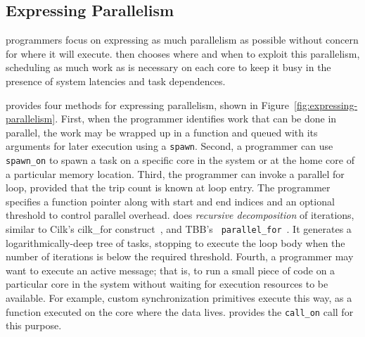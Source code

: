 



\subsection{Expressing Parallelism}

\Grappa programmers focus on expressing as much parallelism as possible
without concern for where it will execute. \Grappa then chooses where and when
to exploit this parallelism, scheduling as much work as is necessary on each
core to keep it busy in the presence of system latencies and task dependences.

\Grappa provides four methods for expressing parallelism, shown in
Figure~\ref{fig:expressing-parallelism}. First, when the programmer identifies
work that can be done in parallel, the work may be wrapped up in a function
and queued with its arguments for later execution using a \texttt{spawn}.
Second, a programmer can use \texttt{spawn\_on} to spawn a task on a specific
core in the system or at the home core of a particular memory location. Third,
the programmer can invoke a parallel for loop, provided that the trip count is
known at loop entry. The programmer specifies a function pointer along with
start and end indices and an optional threshold to control parallel overhead.
\Grappa does {\em recursive decomposition} of iterations, similar to Cilk's
cilk\_for construct~\cite {cilkforimplementation}, and TBB's {\tt
parallel\_for}~\cite{intel_tbb}. It generates a logarithmically-deep tree of
tasks, stopping to execute the loop body when the number of iterations is
below the required threshold. Fourth, a programmer may want to execute an active message; that is, to run a
small piece of code on a particular core in the system without waiting for
execution resources to be available. For example, custom synchronization
primitives execute this way, as a function executed on the core where the data
lives. \Grappa provides the \texttt{call\_on} call for this purpose.

